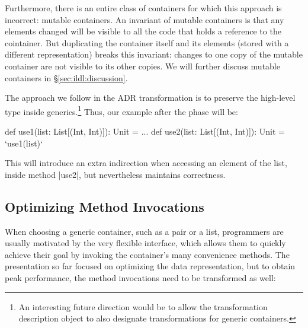 Furthermore, there is an entire class of containers for which this approach is incorrect: mutable containers. An invariant of mutable containers is that any elements changed will be visible to all the code that holds a reference to the cointainer. But duplicating the container itself and its elements (stored with a different representation) breaks this invariant: changes to one copy of the mutable container are not visible to its other copies. We will further discuss mutable containers in \S\ref{sec:ildl:discussion}.

The approach we follow in the ADR transformation is to
preserve the high-level type inside generics.\footnote{An interesting
  future direction would be to allow the transformation description
  object to also designate transformations for generic containers.}
Thus, our example after the \commit{} phase will be:

\begin{lstlisting-nobreak}
def use1(list: List[(Int, Int)]): Unit = ...
def use2(list: List[(Int, Int)]): Unit = `use1(list)`
\end{lstlisting-nobreak}

This will introduce an extra indirection when accessing an element of the list, inside method |use2|, but nevertheless maintains correctness.



\subsection{Optimizing Method Invocations}
\label{sec:ildl:semantics}

When choosing a generic container, such as a pair or a list, programmers are usually motivated by the very flexible interface, which allows them to quickly achieve their goal by invoking the container's many convenience methods. The presentation so far focused on optimizing the data representation, but to obtain peak performance, the method invocations need to be transformed as well:

